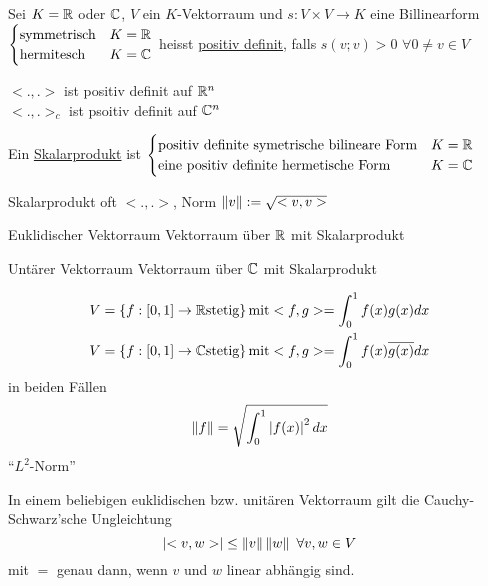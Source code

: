 \begin{Def}
  Sei $K=\mathbb{R}$ oder $\mathbb{C}$, $V$ ein $K$-Vektorraum und $s:V\times V\to K$ eine Billinearform $\begin{cases}
    \text{symmetrisch} & K= \mathbb{R} \\
    \text{hermitesch} & K=\mathbb{C}
  \end{cases}$
  heisst \underline{positiv definit}, falls $s(v;v)>0$ $\forall 0 \neq v\in V$
\end{Def}
\begin{Bsp}
  $<.,.>$ ist positiv definit auf $\mathbb{R}^n$\\
  $<.,.>_c$ ist psoitiv definit auf $\mathbb{C}^n$
\end{Bsp}
\begin{Def}
  Ein \underline{Skalarprodukt} ist $ \begin{cases}
    \text{positiv definite symetrische bilineare Form} & K=\mathbb{R}\\
    \text{eine positiv definite hermetische Form} & K=\mathbb{C}
  \end{cases}$ 
\end{Def}
\begin{Def}
  Skalarprodukt oft $<.,.>$, Norm $\left\| v \right\| := \sqrt{<v,v>}$
\end{Def}
\begin{Def}{Euklidischer Vektorraum}
  Vektorraum über $\mathbb{R}$ mit Skalarprodukt
\end{Def}
\begin{Def}{Untärer Vektorraum}
  Vektorraum über $\mathbb{C}$ mit Skalarprodukt
\end{Def}
\begin{Bsp}
  \begin{align*}
    V=\left\{ f:[0,1]\to\mathbb{R} \text{stetig} \right\} \text{mit} <f,g>=\int_0^1f(x)g(x)dx\\
    V=\left\{ f:[0,1]\to\mathbb{C} \text{stetig} \right\} \text{mit} <f,g>=\int_0^1f(x)\overline{g(x)}dx
  \end{align*}
  in beiden Fällen
  \[\left\| f \right\|=\sqrt{\int_0^1\left| f(x) \right|^2dx}\]
  ``$L^2$-Norm''
\end{Bsp}
\begin{Bem}
  In einem beliebigen euklidischen bzw. unitären Vektorraum gilt die Cauchy-Schwarz'sche Ungleichtung
  \[\left| <v,w> \right|\leq \left\| v \right\|\left\| w \right\|\ \forall v,w\in V\]
  mit $=$ genau dann, wenn $v$ und $w$ linear abhängig sind.
\end{Bem}
